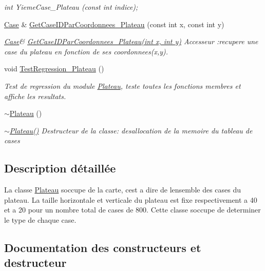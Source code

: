 \begin{DoxyCompactItemize}
\begin{DoxyCompactList}\small\item\em int Yieme\+Case\+\_\+\+Plateau (const int indice); \end{DoxyCompactList}\item 
\hyperlink{classCase}{Case} \& \hyperlink{classPlateau_af775a4c61923f8e0aa1f6431eca2be70}{Get\+Case\+I\+D\+Par\+Coordonnees\+\_\+\+Plateau} (const int x, const int y)
\begin{DoxyCompactList}\small\item\em \hyperlink{classCase}{Case}\& \hyperlink{classPlateau_af775a4c61923f8e0aa1f6431eca2be70}{Get\+Case\+I\+D\+Par\+Coordonnees\+\_\+\+Plateau(int x, int y)} Accesseur \+:recupere une case du plateau en fonction de ses coordonnees(x,y). \end{DoxyCompactList}\item 
void \hyperlink{classPlateau_a80e520c24aeee0863fb9838cfc9364e7}{Test\+Regression\+\_\+\+Plateau} ()
\begin{DoxyCompactList}\small\item\em Test de regression du module \hyperlink{classPlateau}{Plateau}, teste toutes les fonctions membres et affiche les resultats. \end{DoxyCompactList}\item 
\mbox{\label{classPlateau_a0e6ae72e4d7e9923f996c1247e6a6c8b}} 
\hyperlink{classPlateau_a0e6ae72e4d7e9923f996c1247e6a6c8b}{$\sim$\+Plateau} ()
\begin{DoxyCompactList}\small\item\em \hyperlink{classPlateau_a0e6ae72e4d7e9923f996c1247e6a6c8b}{$\sim$\+Plateau()} Destructeur de la classe\+: desallocation de la memoire du tableau de cases \end{DoxyCompactList}\end{DoxyCompactItemize}


\subsection{Description détaillée}
La classe \hyperlink{classPlateau}{Plateau} s\textquotesingle{}occupe de la carte, c\textquotesingle{}est a dire de l\textquotesingle{}ensemble des cases du plateau. La taille horizontale et verticale du plateau est fixe respectivement a 40 et a 20 pour un nombre total de cases de 800. Cette classe s\textquotesingle{}occupe de determiner le type de chaque case. 

\subsection{Documentation des constructeurs et destructeur}
\mbox{\label{classPlateau_a07026170529dd928238ee45de0a797d7}} 
